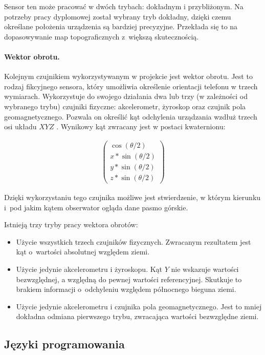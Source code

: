Sensor ten może pracować w dwóch trybach: dokładnym i przybliżonym. Na potrzeby pracy dyplomowej został wybrany tryb dokładny, dzięki czemu określane położenia urządzenia są bardziej precyzyjne. Przekłada się to na dopasowywanie map topograficznych z~większą skutecznością.


\paragraph{Wektor obrotu.} Kolejnym czujnikiem wykorzystywanym w projekcie jest wektor obrotu. Jest to rodzaj fikcyjnego sensora, który umożliwia określenie orientacji telefonu w trzech wymiarach. Wykorzystuje do swojego działania dwa lub trzy (w zależności od wybranego trybu) czujniki fizyczne: akcelerometr, żyroskop oraz czujnik pola geomagnetycznego. Pozwala on określić kąt odchylenia urządzania wzdłuż trzech osi układu $XYZ$ \cite{android_sensor_training}. Wynikowy kąt zwracany jest w postaci kwaternionu:

\begin{align*}
\begin{pmatrix}
    \cos{(\theta/2)} \\ x*\sin{(\theta/2)} \\ y*\sin{(\theta/2)} \\ z*\sin{(\theta/2)}
\end{pmatrix}
\end{align*}

Dzięki wykorzystaniu tego czujnika możliwe jest stwierdzenie, w którym kierunku i~pod jakim kątem obserwator ogląda dane pasmo górskie.

\par

Istnieją trzy tryby pracy wektora obrotów:
\begin{itemize}
    \item Użycie wszystkich trzech czujników fizycznych. Zwracanym rezultatem jest kąt o~wartości absolutnej względem ziemi.
    \item Użycie jedynie akcelerometru i żyroskopu. Kąt $Y$ nie wskazuje wartości bezwzględnej, a względną do pewnej wartości referencyjnej. Skutkuje to brakiem informacji o~odchyleniu względem północnego bieguna ziemi.
    \item Użycie jedynie akcelerometru i czujnika pola geomagnetycznego. Jest to mniej dokładna odmiana pierwszego trybu, zwracająca wartości bezwzględne ziemi.
\end{itemize}


\subsection{Języki programowania}

